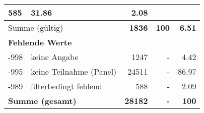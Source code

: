 \begin{longtable}{lXrrr}
       \num{585} &
       \num[round-mode=places,round-precision=2]{31.86} &
         \num[round-mode=places,round-precision=2]{2.08} \\
     \midrule
     \multicolumn{2}{l}{Summe (gültig)} &
       \textbf{\num{1836}} &
     \textbf{\num{100}} &
       \textbf{\num[round-mode=places,round-precision=2]{6.51}} \\
     \multicolumn{5}{l}{\textbf{Fehlende Werte}}\\
       -998 &
       keine Angabe &
         \num{1247} &
        - &
         \num[round-mode=places,round-precision=2]{4.42} \\
       -995 &
       keine Teilnahme (Panel) &
         \num{24511} &
        - &
         \num[round-mode=places,round-precision=2]{86.97} \\
       -989 &
       filterbedingt fehlend &
         \num{588} &
        - &
         \num[round-mode=places,round-precision=2]{2.09} \\
     \midrule
     \multicolumn{2}{l}{\textbf{Summe (gesamt)}} &
          \textbf{\num{28182}} &
        \textbf{-} &
        \textbf{\num{100}} \\
     \bottomrule
     \end{longtable}
     
